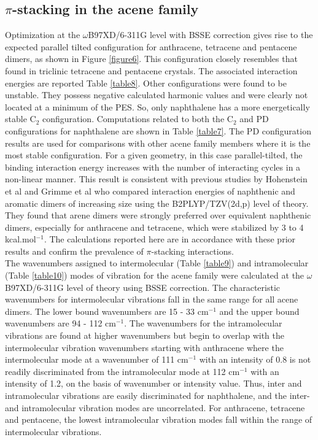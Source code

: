\subsection{$\pi$-stacking in the acene family}

Optimization at the $\omega$B97XD/6-311G level with BSSE correction gives rise to the expected parallel tilted configuration \cite{brock1990temperature} for anthracene, tetracene and pentacene dimers, as shown in Figure \ref{figure6}. This configuration closely resembles that found in triclinic tetracene\cite{campbell1962crystal} and pentacene\cite{holmes1999nature} crystals. The associated interaction energies are reported Table \ref{table8}.  Other configurations were found to be unstable. They possess negative calculated harmonic values and were clearly not located at a minimum of the PES. So, only naphthalene has a more energetically stable C$_{2}$ configuration. Computations related to both the C$_{2}$ and PD configurations for naphthalene are shown in Table \ref{table7}. The PD configuration results are used for comparisons with other acene family members where it is the most stable configuration.
For a given geometry, in this case parallel-tilted, the binding interaction energy increases with the number of interacting cycles in a non-linear manner. This result is consistent with previous studies by Hohenstein et al \cite{hohenstein2010density} and Grimme et al\cite{grimme2008special} who compared interaction energies of naphthenic and aromatic dimers of increasing size using the B2PLYP/TZV(2d,p) level of theory. They found that arene dimers were strongly preferred over equivalent naphthenic dimers, especially for anthracene and tetracene, which were stabilized by 3 to 4 kcal.mol$^{-1}$. The calculations reported here are in accordance with these prior results and confirm the prevalence of $\pi$-stacking interactions.\\

The wavenumbers assigned to intermolecular (Table \ref{table9}) and intramolecular (Table \ref{table10}) modes of vibration for the acene family were calculated at the $\omega$B97XD/6-311G level of theory using BSSE correction. The characteristic wavenumbers for intermolecular vibrations fall in the same range for all  acene dimers. The lower bound wavenumbers are 15 - 33 cm$^{-1}$ and the upper bound wavenumbers are 94 - 112 cm$^{-1}$. The wavenumbers for the intramolecular vibrations are found at higher wavenumbers but begin to overlap with the intermolecular vibration wavenumbers starting with anthracene where the intermolecular mode at a wavenumber of 111 cm$^{-1}$ with an intensity of 0.8 is not readily discriminated from the intramolecular mode at 112 cm$^{-1}$ with an intensity of 1.2, on the basis of wavenumber or intensity value. Thus, inter and intramolecular vibrations are easily discriminated for naphthalene, and the inter- and intramolecular vibration modes are uncorrelated. For anthracene, tetracene and pentacene, the lowest intramolecular vibration modes fall within the range of intermolecular vibrations.\\ 

